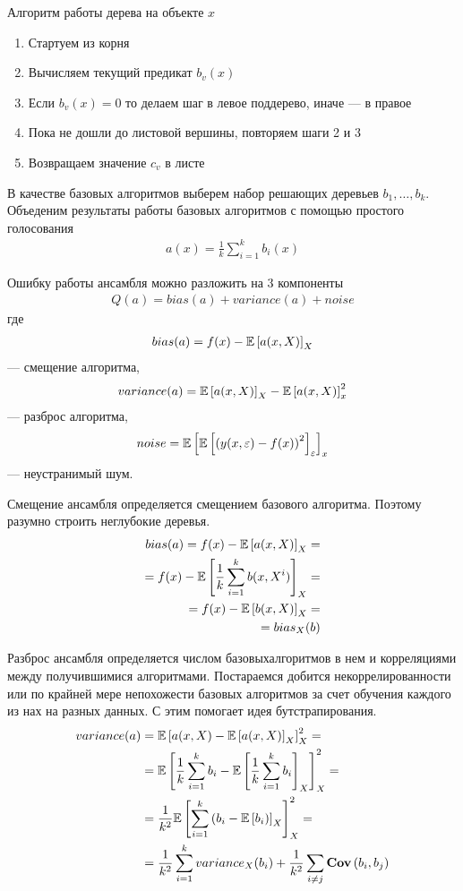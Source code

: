 Алгоритм работы дерева на объекте $x$
\begin{enumerate}
	\item Стартуем из корня
	\item Вычисляем текущий предикат $b_v(x)$
	\item Если $b_v(x) = 0$ то делаем шаг в левое поддерево, иначе --- в правое
	\item Пока не дошли до листовой вершины, повторяем шаги 2 и 3
	\item Возвращаем значение $c_v$ в листе
\end{enumerate}

В качестве базовых алгоритмов выберем набор решающих деревьев $b_1, \dots, b_k$.
Объеденим результаты работы базовых алгоритмов с помощью простого голосования
\begin{align}
	a(x) = \frac{1}{k} \sum_{i=1}^{k} b_i(x)
\end{align}

Ошибку работы ансамбля можно разложить на 3 компоненты
\begin{align}
	Q(a) = bias(a) + variance(a) + noise
\end{align}
где
\begin{align}
	bias(a) = f(x) - \mathbb{E}\left[a(x, X)\right]_X \\
\end{align} 
--- смещение алгоритма,
\begin{align}
	variance(a) = \mathbb{E}\left[a(x, X)\right]_X -\mathbb{E}\left[a(x, X)\right]_x^2 \\
\end{align}
--- разброс алгоритма,
\begin{align}
	noise = \mathbb{E}\left[\mathbb{E}\left[\left( y(x, \varepsilon) - f(x) \right)^2\right]_{\varepsilon}\right]_x
\end{align}
--- неустранимый шум.

Смещение ансамбля определяется смещением базового алгоритма. Поэтому разумно строить неглубокие деревья.
\begin{align}
	bias(a) = 
	f(x) - \mathbb{E}\left[a(x, X)\right]_X = \\
	= f(x) - \mathbb{E}\left[\frac{1}{k} \sum_{i=1}^{k} b(x, X^i)\right]_X = \\
	= f(x) - \mathbb{E}\left[b(x, X)\right]_X = \\
	= bias_X(b)
\end{align}

Разброс ансамбля определяется числом базовыхалгоритмов в нем и корреляциями между получившимися алгоритмами.
Постараемся добится некоррелированности или по крайней мере непохожести базовых алгоритмов за счет обучения
каждого из нах на разных данных. С этим помогает идея бутстрапирования.
\begin{align}
	variance(a) & = \mathbb{E}\left[a(x, X) - \mathbb{E}\left[a(x, X)\right]_X \right]_X^2 = \\
	& = \mathbb{E}\left[\frac{1}{k} \sum_{i=1}^{k} b_i - \mathbb{E}\left[\frac{1}{k} \sum_{i=1}^{k} b_i \right]_X \right]_X^2 = \\
	& = \frac{1}{k^2} \mathbb{E}\left[\sum_{i=1}^{k} \left( b_i - \mathbb{E}\left[b_i \right)\right]_X \right]_X^2 = \\
	& = \frac{1}{k^2} \sum_{i=1}^{k} variance_X(b_i) + 
	\frac{1}{k^2} \sum_{i \ne j} \textbf{Cov}\left(b_i, b_j\right)
\end{align}

